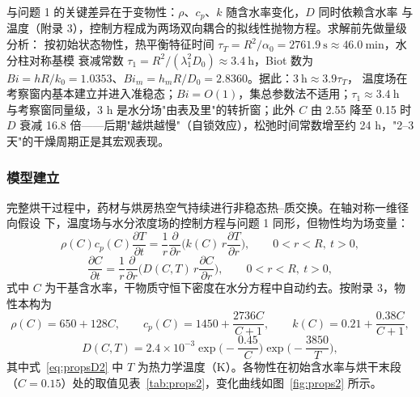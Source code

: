 与问题 1 的关键差异在于变物性：$\rho$、$c_p$、$k$ 随含水率变化，$D$ 同时依赖含水率
与温度（附录 3），控制方程成为两场双向耦合的拟线性抛物方程。求解前先做量级分析：
按初始状态物性，热平衡特征时间
$\tau_T=R^2/\alpha_0=2761.9\ \mathrm{s}\approx46.0\ \mathrm{min}$，水分柱对称基模
衰减常数
$\tau_1=R^2/(\lambda_1^2D_0)\approx3.4\ \mathrm{h}$，Biot 数为
$Bi=hR/k_0=1.0353$、$Bi_m=h_mR/D_0=2.8360$。据此：$3\ \mathrm{h}\approx3.9\tau_T$，
温度场在考察窗内基本建立并进入准稳态；$Bi=O(1)$，集总参数法不适用；$\tau_1\approx
3.4\ \mathrm{h}$ 与考察窗同量级，3 h 是水分场"由表及里"的转折窗；此外 $C$ 由 2.55
降至 0.15 时 $D$ 衰减 16.8 倍——后期"越烘越慢"（自锁效应），松弛时间常数增至约
24 h，"2–3 天"的干燥周期正是其宏观表现。

\subsubsection{模型建立}

完整烘干过程中，药材与烘房热空气持续进行非稳态热--质交换。在轴对称一维径向假设
下，温度场与水分浓度场的控制方程与问题 1 同形，但物性均为场变量：
\begin{equation}
  \rho(C)c_p(C)\frac{\partial T}{\partial t}
  =\frac{1}{r}\frac{\partial}{\partial r}\Big(k(C)\,r\frac{\partial T}{\partial r}\Big),
  \qquad 0<r<R,\ t>0,
  \label{eq:heat2}
\end{equation}
\begin{equation}
  \frac{\partial C}{\partial t}
  =\frac{1}{r}\frac{\partial}{\partial r}\Big(D(C,T)\,r\frac{\partial C}{\partial r}\Big),
  \qquad 0<r<R,\ t>0,
  \label{eq:moist2}
\end{equation}
式中 $C$ 为干基含水率，干物质守恒下密度在水分方程中自动约去。按附录 3，物性本构为
\begin{equation}
  \rho(C)=650+128C,
  \qquad
  c_p(C)=1450+\frac{2736C}{C+1},
  \qquad
  k(C)=0.21+\frac{0.38C}{C+1},
  \label{eq:props2}
\end{equation}
\begin{equation}
  D(C,T)=2.4\times10^{-3}\exp\Big(-\frac{0.45}{C}\Big)\exp\Big(-\frac{3850}{T}\Big),
  \label{eq:propsD2}
\end{equation}
其中式~\eqref{eq:propsD2} 中 $T$ 为热力学温度（K）。各物性在初始含水率与烘干末段
（$C=0.15$）处的取值见表~\ref{tab:props2}，变化曲线如图~\ref{fig:props2} 所示。

